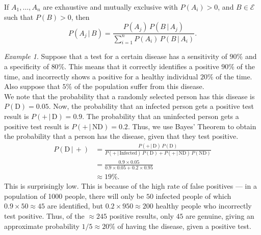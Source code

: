 \documentclass[11pt]{article}
\theoremstyle{definition}
\theoremstyle{remark}
\newtheorem*{example}{Example}
\numberwithin{equation}{module}
\begin{document}
    \begin{corollary}
        If $A_1, \dots, A_n$ are exhaustive and mutually exclusive with $P(A_i) >
        0$, and $B \in \mathcal{E}$ such that $P(B) > 0$, then \[
            P(A_j \,|\, B) = \frac{P(A_j) \,P(B\,|\, A_j)}{\sum_{i = 1}^n P(A_i)\,
            P(B \,|\, A_i)}.
        \] 
    \end{corollary}
    \begin{example}
        Suppose that a test for a certain disease has a sensitivity of $90\%$ and a
        specificity of $80\%$. This means that it correctly identifies a positive
        $90\%$ of the time, and incorrectly shows a positive for a healthy
        individual $20\%$ of the time. Also suppose that $5\%$ of the population
        suffer from this disease. \\

        We note that the probability that a randomly selected person has this
        disease is $P(\text{D}) = 0.05$. Now, the probability that an
        infected person gets a positive test result is $P(+ \,|\, \text{D}) =
        0.9$. The probability that an uninfected person gets a positive test result
        is $P(+ \,|\, \text{ND}) = 0.2$. Thus, we use Bayes' Theorem to
        obtain the probability that a person has the disease, given that they test
        positive. 
        \begin{align*}
            P(\text{D} \,|\, +) &= \frac{P(+ \,|\, \text{D}) \,
                P(\text{D})}{P(+ \,|\, \text{Infected}) \, P(\text{D}) +
                P(+ \,|\, \text{ND}) \, P(\text{ND})} \\
                &= \frac{0.9\times 0.05}{0.9\times 0.05 + 0.2\times 0.95} \\ 
                &\approx 19\%.
        \end{align*}
        This is surprisingly low. This is because of the high rate of false
        positives --- in a population of 1000 people, there will only be $50$
        infected people of which $0.9 \times 50 \approx 45$ are identified, but $0.2
        \times 950 \approx 200$ healthy people who incorrectly test positive. Thus,
        of the $\approx 245$ positive results, only $45$ are genuine, giving an
        approximate probability $1 /5 \approx 20\%$ of having the disease, given a
        positive test. 


\end{example}
\end{document}

